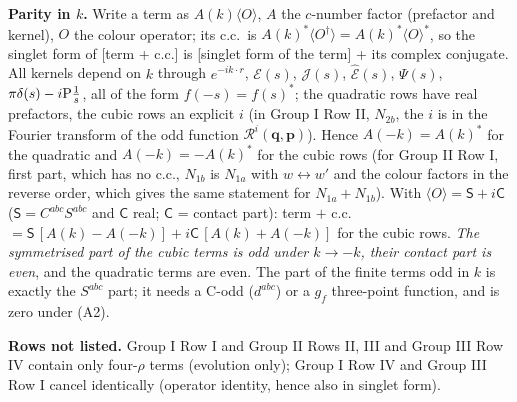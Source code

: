 \documentclass[10pt]{article}
\begin{document}
\noindent\textbf{Parity in $k$.} Write a term as $A(k)\langle O\rangle$, $A$ the $c$-number factor (prefactor and kernel), $O$ the colour operator; its c.c.\ is $A(k)^{*}\langle O^{\dagger}\rangle=A(k)^{*}\langle O\rangle^{*}$, so the singlet form of [term + c.c.] is [singlet form of the term] + its complex conjugate. All kernels depend on $k$ through $e^{-ik\cdot r}$, $\mathcal{E}(s)$, $\mathcal{J}(s)$, $\widehat{\mathcal{E}}(s)$, $\Psi(s)$, $\pi\delta(s)-i{\rm P}\frac1s$, all of the form $f(-s)=f(s)^{*}$; the quadratic rows have real prefactors, the cubic rows an explicit $i$ (in Group I Row II, $N_{2b}$, the $i$ is in the Fourier transform of the odd function $\mathcal{R}^{i}(\mathbf{q},\mathbf{p})$). Hence $A(-k)=A(k)^{*}$ for the quadratic and $A(-k)=-A(k)^{*}$ for the cubic rows (for Group II Row I, first part, which has no c.c., $N_{1b}$ is $N_{1a}$ with $w\leftrightarrow w'$ and the colour factors in the reverse order, which gives the same statement for $N_{1a}+N_{1b}$). With $\langle O\rangle=\mathsf{S}+i\mathsf{C}$ ($\mathsf{S}=C^{abc}S^{abc}$ and $\mathsf{C}$ real; $\mathsf{C}$ = contact part): term $+$ c.c.\ $=\mathsf{S}\,[A(k)-A(-k)]+i\mathsf{C}\,[A(k)+A(-k)]$ for the cubic rows. \emph{The symmetrised part of the cubic terms is odd under $k\to-k$, their contact part is even}, and the quadratic terms are even. The part of the finite terms odd in $k$ is exactly the $S^{abc}$ part; it needs a C-odd ($d^{abc}$) or a $g_{f}$ three-point function, and is zero under (A2).

\noindent\textbf{Rows not listed.} Group I Row I and Group II Rows II, III and Group III Row IV contain only four-$\rho$ terms (evolution only); Group I Row IV and Group III Row I cancel identically (operator identity, hence also in singlet form).
\end{document}
